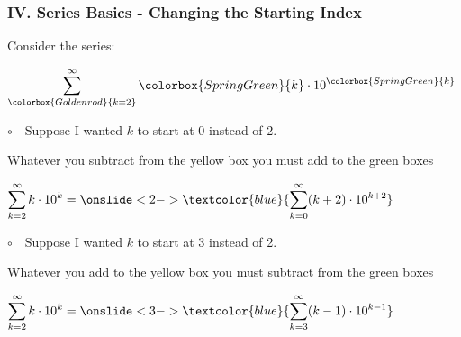 \begin{frame}
\frametitle{IV. Series Basics - Changing the Starting Index}
\scriptsize

Consider the series:

\begin{center}
	$\displaystyle{\sum \limits_{\colorbox{Goldenrod}{k = 2}}^{\infty} \colorbox{SpringGreen}{k} \cdot 10^{\colorbox{SpringGreen}{k}}}$ \\
\end{center}

$\circ$ \,\, Suppose I wanted $k$ to start at 0 instead of 2. \\

\vspace{0.2cm}

\hspace{0.3cm} Whatever you subtract from the yellow box you must add to the green boxes \\

\begin{center}
	$\displaystyle{\sum \limits_{k = 2}^{\infty} k \cdot 10^{k} = \onslide<2->{\textcolor{blue}{ \sum \limits_{k = 0}^{\infty} (k+2) \cdot 10^{k+2}}}}$
\end{center}

$\circ$ \,\, Suppose I wanted $k$ to start at 3 instead of 2. \\

\vspace{0.2cm}

\hspace{0.3cm} Whatever you add to the yellow box you must subtract from the green boxes \\

\begin{center}
	$\displaystyle{\sum \limits_{k = 2}^{\infty} k \cdot 10^{k} = \onslide<3->{\textcolor{blue}{ \sum \limits_{k = 3}^{\infty} (k-1) \cdot 10^{k-1}}}}$
\end{center}

\vspace{0.2cm}

\end{frame}

